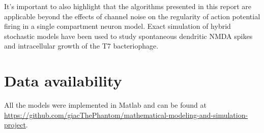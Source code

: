It's important to also highlight that the algorithms presented in this report are applicable beyond the effects of channel noise on the regularity of action potential firing in a single compartment neuron model. Exact simulation of hybrid stochastic models have been used to study spontaneous dendritic NMDA spikes and intracellular growth of the T7 bacteriophage.

\section{Data availability}
All the models were implemented in Matlab and can be found at \href{https://github.com/giacThePhantom/mathematical-modeling-and-simulation-project}{https://github.com/giacThePhantom/mathematical-modeling-and-simulation-project}.


